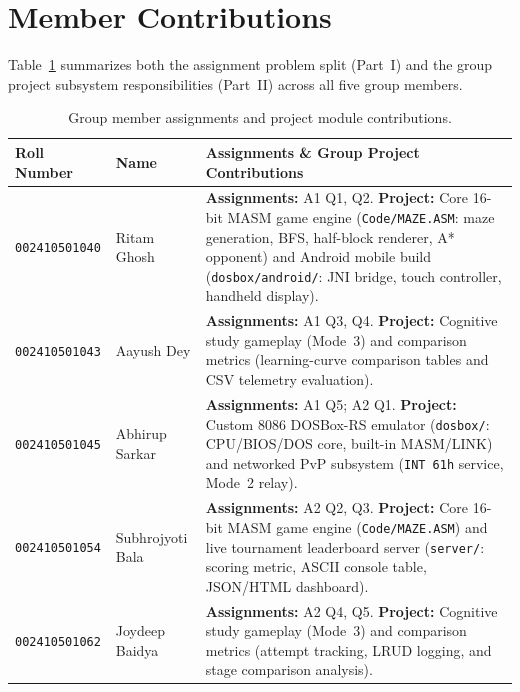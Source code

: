 \documentclass[11pt,a4paper]{article}
\begin{document}
\section{Member Contributions}

Table~\ref{tab:contributions} summarizes both the assignment problem split (Part~I) and the group project subsystem responsibilities (Part~II) across all five group members.

\begin{table}[H]
    \centering
    \caption{Group member assignments and project module contributions.}
    \label{tab:contributions}
    \small
    \begin{tabular}{@{}llp{9.0cm}@{}}
        \toprule
        \textbf{Roll Number} & \textbf{Name} & \textbf{Assignments \& Group Project Contributions} \\
        \midrule
        \texttt{002410501040} & Ritam Ghosh      & \textbf{Assignments:} A1 Q1, Q2. \textbf{Project:} Core 16-bit MASM game engine (\texttt{Code/MAZE.ASM}: maze generation, BFS, half-block renderer, A* opponent) and Android mobile build (\texttt{dosbox/android/}: JNI bridge, touch controller, handheld display). \\[0.1cm]
        \texttt{002410501043} & Aayush Dey       & \textbf{Assignments:} A1 Q3, Q4. \textbf{Project:} Cognitive study gameplay (Mode~3) and comparison metrics (learning-curve comparison tables and CSV telemetry evaluation). \\[0.1cm]
        \texttt{002410501045} & Abhirup Sarkar   & \textbf{Assignments:} A1 Q5; A2 Q1. \textbf{Project:} Custom 8086 DOSBox-RS emulator (\texttt{dosbox/}: CPU/BIOS/DOS core, built-in MASM/LINK) and networked PvP subsystem (\texttt{INT 61h} service, Mode~2 relay). \\[0.1cm]
        \texttt{002410501054} & Subhrojyoti Bala & \textbf{Assignments:} A2 Q2, Q3. \textbf{Project:} Core 16-bit MASM game engine (\texttt{Code/MAZE.ASM}) and live tournament leaderboard server (\texttt{server/}: scoring metric, ASCII console table, JSON/HTML dashboard). \\[0.1cm]
        \texttt{002410501062} & Joydeep Baidya   & \textbf{Assignments:} A2 Q4, Q5. \textbf{Project:} Cognitive study gameplay (Mode~3) and comparison metrics (attempt tracking, LRUD logging, and stage comparison analysis). \\
        \bottomrule
    \end{tabular}
\end{table}
\end{document}
